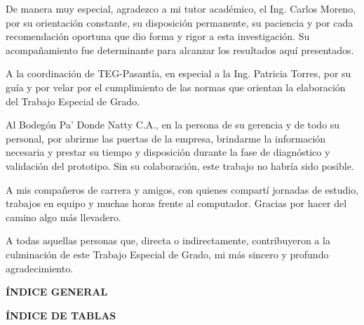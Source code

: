 \documentclass[12pt, letterpaper]{report}
\renewcommand{\contentsname}{ÍNDICE GENERAL}
\renewcommand{\listtablename}{ÍNDICE DE TABLAS}
\begin{document}
{De manera muy especial, agradezco a mi tutor académico, el Ing. Carlos Moreno, por su orientación constante, su disposición permanente, su paciencia y por cada recomendación oportuna que dio forma y rigor a esta investigación. Su acompañamiento fue determinante para alcanzar los resultados aquí presentados.

A la coordinación de TEG-Pasantía, en especial a la Ing. Patricia Torres, por su guía y por velar por el cumplimiento de las normas que orientan la elaboración del Trabajo Especial de Grado.

Al Bodegón Pa' Donde Natty C.A., en la persona de su gerencia y de todo su personal, por abrirme las puertas de la empresa, brindarme la información necesaria y prestar su tiempo y disposición durante la fase de diagnóstico y validación del prototipo. Sin su colaboración, este trabajo no habría sido posible.

A mis compañeros de carrera y amigos, con quienes compartí jornadas de estudio, trabajos en equipo y muchas horas frente al computador. Gracias por hacer del camino algo más llevadero.

A todas aquellas personas que, directa o indirectamente, contribuyeron a la culminación de este Trabajo Especial de Grado, mi más sincero y profundo agradecimiento.
\par}

\clearpage
\begin{center}
{\fontsize{14}{16}\selectfont\bfseries ÍNDICE GENERAL\par}
\end{center}
\vspace{8pt}

\begingroup
{}
\renewcommand{\contentsname}{}
\vspace{-2.5cm}
\tableofcontents
\endgroup

\clearpage
\begin{center}
{\fontsize{14}{16}\selectfont\bfseries ÍNDICE DE TABLAS\par}
\end{center}
\vspace{8pt}

\begingroup
{}
\renewcommand{\listtablename}{}
\vspace{-2.5cm}
\listoftables
\endgroup
\end{document}
